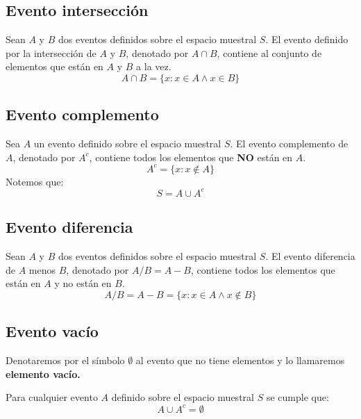 \documentclass[12pt,twocolumn,a4paper]{report}
\begin{document}
\subsection*{Evento intersección}
Sean $A$ y $B$ dos eventos definidos sobre el espacio muestral $S$. El evento definido por la intersección de $A$ y $B$, denotado por $A \cap B$, contiene al conjunto de elementos que están en $A$ y $B$ a la vez. 
$$
A \cap B = \{x: x \in A \wedge x \in B \}
$$

\subsection*{Evento complemento}
Sea $A$ un evento definido sobre el espacio muestral $S$. El evento complemento de $A$, denotado por $A^c$, contiene todos los elementos que \textbf{NO} están en $A$.
$$
A^c = \{x: x \not\in A \}
$$
Notemos que: 
$$
S = A \cup A^c 
$$

\subsection*{Evento diferencia}
Sean $A$ y $B$ dos eventos definidos sobre el espacio muestral $S$. El evento diferencia de $A$ menos $B$, denotado por $A / B = A - B$, contiene todos los elementos que están en $A$ y no están en $B$.
$$
A/B = A-B = \{x: x \in A \wedge x \not\in B\}
$$

\subsection*{Evento vacío}
Denotaremos por el símbolo $\emptyset$ al evento que no tiene elementos y lo llamaremos \textbf{elemento vacío.}

Para cualquier evento $A$ definido sobre el espacio muestral $S$ se cumple que: 
$$
A \cup A^c = \emptyset
$$
\end{document}
